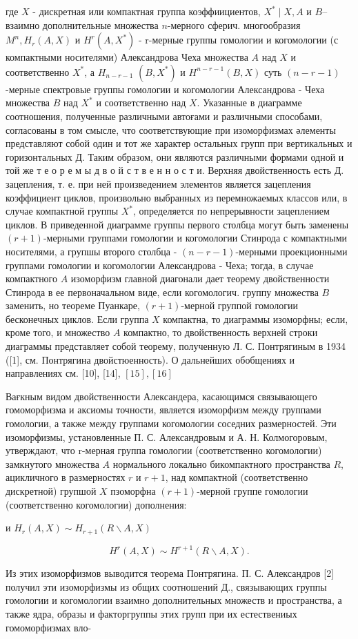 \documentclass[10pt]{article}
\begin{document}
где $X$ - дискретная или компактная группа коэффиициентов, $X^{*} \mid X, A$ и $B$-- взаимно дополнительные множества $n$-мерного сферич. многообразия $M^{n}, H_{r}(A, X)$ и $H^{r}\left(A, X^{*}\right)$ - r-мерные группы гомологии и когомологии (с компактными носителями) Александрова Чеха множества $A$ над $X$ и соответственно $X^{*}$, а $H_{n-r-1}$ $\left(B, X^{*}\right)$ и $H^{n-r-1}(B, X)$ суть $(n-r-1)$-мерные спектровые группы гомологии и когомологии Александрова - Чеха множества $B$ над $X^{*}$ и соответственно над $X$. Указанные в диаграмме соотношения, полученные различными автоғами и различными способами, согласованы в том смысле, что соответствующие при изоморфизмах әлементы представляют собой один и тот же характер остальных групп при вертикальных и горизонтальных Д. Таким образом, они являются различными формами одной и той же т е о р е м ы д в о й с т в е н н о с т и. Верхняя двойственность есть Д. зацепления, т. е. при ней произведением элементов является зацепления коэффициент циклов, произвольно выбранных из перемножаемых классов или, в случае компактной группы $X^{*}$, определяется по непрерывности зацеплением циклов. В приведенной диаграмме группы первого столбца могут быть заменены $(r+1)$-мерными группами гомологии и когомологии Стинрода с компактными носителями, а групшы второго столбца - $(n-r-1)$-мерными проекционными группами гомологии и когомологии Александрова - Чеха; тогда, в случае компактного $A$ изоморфизм главной диагонали дает теорему двойственности Стинрода в ее первоначальном виде, если когомологич. группу множества $B$ заменить, но теореме Пуанкаре, $(r+1)$-мерной группой гомологии бесконечных циклов. Если группа $X$ компактна, то диаграммы изоморфны; если, кроме того, и множество $A$ компактно, то двойственность верхней строки диаграммы представляет собой теорему, полученную Л. С. Понтрягиным в 1934 ([1], см. Понтрягина двойстюенность). О дальнейших обобщениях и направлениях см. [10], [14], $[15],[16]$



Вағкным видом двойственности Александера, касающимся связывающего гомоморфизма и аксиомы точности, является изоморфизм между группами гомологии, а также между группами когомологии соседних размерностей. Эти изоморфизмы, установленные П. С. Александровым и А. Н. Колмогоровым, утверждают, что r-мерная группа гомологии (соответственно когомологии) замкнутого множества $A$ нормального локально бикомпактного пространства $R$, ацикличного в размерностях $r$ и $r+1$, над компактной (соответственно дискретной) групшой $X$ пзоморфна $(r+1)$-мерной группе гомологии (соответственно когомологии) дополнения:



и $H_{r}(A, X) \sim H_{r+1}(R \backslash A, X)$



\[

H^{r}(A, X) \sim H^{r+1}(R \backslash A, X) .

\]



Из этих изоморфизмов выводится теорема Понтрягина. П. С. Александров [2] получил эти изоморфизмы из общих соотношений Д., связывающих группы гомологии и когомологии взаимно дополнительных множеств и пространства, а также ядра, образы и факторгруппы этих групп при их естествениых гомоморфизмах вло-
\end{document}
